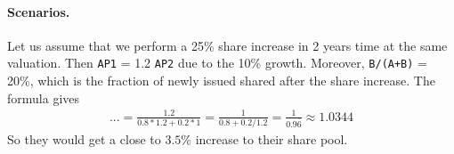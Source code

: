 \documentclass{article}
\begin{document}
\paragraph{Scenarios.} Let us assume that we perform a 25\% share increase in 2 years time at the same valuation. Then \texttt{AP1}  = 1.2 \texttt{AP2} due to the 10\% growth. Moreover, \texttt{B/(A+B)} = 20\%, which is the fraction of newly issued shared after the share increase. The formula gives
\begin{align*}
... = \frac{1.2}{0.8 * 1.2 + 0.2 * 1} = \frac{1}{0.8 +  0.2/1.2}  = \frac{1}{0.9\bar{6}} \approx 1.0344
\end{align*}
So they would get a close to $3.5\%$ increase to their share pool.
\end{document}

